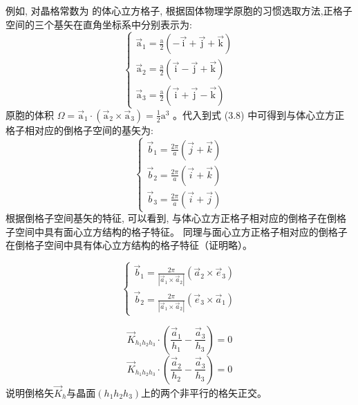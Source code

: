 \documentclass[UTF8,12pt, a4paper, oneside]{ctexart}
\begin{document}
    {例如, 对晶格常数为  的体心立方格子, 根据固体物理学原胞的习惯选取方法,正格子空间的三个基矢在直角坐标系中分别表示为:$$
        \left\{\begin{array}{l}
        \overrightarrow{\mathrm{a}}_{1}=\frac{\mathrm{a}}{2}(-\overrightarrow{\mathrm{i}}+\overrightarrow{\mathrm{j}}+\overrightarrow{\mathrm{k}}) \\
        \overrightarrow{\mathrm{a}}_{2}=\frac{\mathrm{a}}{2}(\overrightarrow{\mathrm{i}}-\overrightarrow{\mathrm{j}}+\overrightarrow{\mathrm{k}}) \\
        \overrightarrow{\mathrm{a}}_{3}=\frac{\mathrm{a}}{2}(\overrightarrow{\mathrm{i}}+\overrightarrow{\mathrm{j}}-\overrightarrow{\mathrm{k}})
        \end{array}\right.
        $$
        原胞的体积 $\Omega=\overrightarrow{\mathrm{a}}_{1} \cdot\left(\overrightarrow{\mathrm{a}}_{2} \times \overrightarrow{\mathrm{a}}_{3}\right)=\frac{1}{2} \mathrm{a}^{3}$ 。代入到式 (3.8) 中可得到与体心立方正 格子相对应的倒格子空间的基矢为:
        $$
        \left\{\begin{array}{l}
        \vec{b}_{1}=\frac{2 \pi}{a}(\vec{j}+\vec{k}) \\
        \vec{b}_{2}=\frac{2 \pi}{a}(\vec{i}+\vec{k}) \\
        \vec{b}_{3}=\frac{2 \pi}{a}(\vec{i}+\vec{j})
        \end{array}\right.
        $$根据倒格子空间基矢的特征, 可以看到, 与体心立方正格子相对应的倒格子在倒格子空间中具有面心立方结构的格子特征。
        同理与面心立方正格子相对应的倒格子在倒格子空间中具有体心立方结构的格子特征（证明略）。}

    {\[\left\{\begin{array}{l}
            \vec{b}_{1}=\frac{2 \pi}{|\vec{a}_{1} \times \vec{a}_{2}|}(\vec{a}_{2} \times \vec{e}_{3}) \\
            \vec{b}_{2}=\frac{2 \pi}{|\vec{a}_{1} \times \vec{a}_{2}|}(\vec{e}_{3} \times \vec{a}_{1})
            \end{array}\right.\]}
  
    {\[\vec{K}_{h_{1} h_{2} h_{3}} \cdot(\frac{\vec{a}_{1}}{h_{1}}-\frac{\vec{a}_{3}}{h_{3}})=0\]
        \[\vec{K}_{h_{1} h_{2} h_{3}} \cdot(\frac{\vec{a}_{2}}{h_{2}}-\frac{\vec{a}_{3}}{h_{3}})=0
        \]说明倒格矢$\vec{K}_{h}$与晶面$(h_1h_2h_3)$上的两个非平行的格矢正交。}
\end{document}

